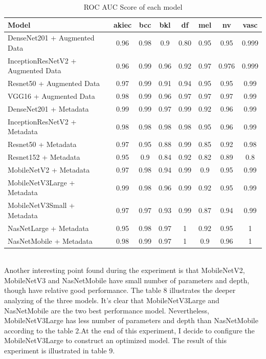 \begin{table}[h]
	\centering
	\begin{tabular}{|l | c | c | c | c | c | c | c|} 
		\hline
		Model & akiec & bcc & bkl & df & mel & nv & vasc \\
		\hline
		DenseNet201 + Augmented Data & 0.96 & 0.98 & 0.9 & 0.80 & 0.95 & 0.95 & 0.999\\ 
		\hline
		InceptionResNetV2 + Augmented Data & 0.96 & 0.99 & 0.96 & 0.92 & 0.97 & 0.976 & 0.999\\
		\hline
		Resnet50 + Augmented Data & 0.97 & 0.99 & 0.91 & 0.94 & 0.95 & 0.95 & 0.99\\
		\hline 	
		VGG16 + Augmented Data & 0.98 & 0.99 & 0.96 & 0.97 & 0.97 & 0.97 & 0.99\\ 
		\hline		
		DenseNet201 + Metadata & 0.99 & 0.99 & 0.97 & 0.99 & 0.92 & 0.96 & 0.99\\
		\hline
		InceptionResNetV2 + Metadata & 0.98 & 0.98 & 0.98 & 0.98 & 0.95 & 0.96 & 0.99\\
		\hline
		Resnet50 + Metadata & 0.97 & 0.95 & 0.88 & 0.99 & 0.85 & 0.92 & 0.98\\
		\hline
		Resnet152 + Metadata & 0.95 & 0.9 & 0.84 & 0.92 & 0.82 & 0.89 & 0.8\\
		\hline
		MobileNetV2 + Metadata & 0.97 & 0.98 & 0.94 & 0.99 & 0.9 & 0.95 & 0.99\\
		\hline
		MobileNetV3Large + Metadata & 0.99 & 0.98 & 0.96 & 0.99 & 0.92 & 0.95 & 0.99\\
		\hline
		MobileNetV3Small + Metadata & 0.97 & 0.97 & 0.93 & 0.99 & 0.87 & 0.94 & 0.99\\
		\hline
		NasNetLarge + Metadata & 0.95 & 0.98 & 0.97 & 1 & 0.92 & 0.95 & 1\\
		\hline
		NasNetMobile + Metadata & 0.98 & 0.99 & 0.97 & 1 & 0.9 & 0.96 & 1\\
		\hline
	\end{tabular}
	\caption{ROC AUC Score of each model}
	\label{table:7}
\end{table}\\
Another interesting point found during the experiment is that MobileNetV2, MobileNetV3 and NasNetMobile have small number of parameters and depth, though have relative good performance. The table 8 illustrates the deeper analyzing of the three models. It's clear that MobileNetV3Large and NasNetMobile are the two best performance model. Nevertheless, MobileNetV3Large has less number of parameters and depth than NasNetMobile according to the table 2.At the end of this experiment, I decide to configure the MobileNetV3Large to construct an optimized model. The result of this experiment is illustrated in table 9.\\
